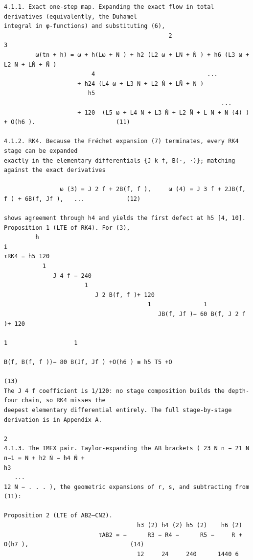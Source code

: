 \documentclass[letterpaper]{article}
\begin{document}
\begin{Verbatim}[fontsize=\fontsize{6.35}{7.15}\selectfont,breaklines=false]
4.1.1. Exact one-step map. Expanding the exact flow in total derivatives (equivalently, the Duhamel
integral in φ-functions) and substituting (6),
                                               2                       3
         ω(tn + h) = ω + h(Lω + N ) + h2 (L2 ω + LN + Ṅ ) + h6 (L3 ω + L2 N + LṄ + N̈ )
                         4                                ...
                     + h24 (L4 ω + L3 N + L2 Ṅ + LN̈ + N )
                        h5
                                                              ...
                     + 120  (L5 ω + L4 N + L3 Ṅ + L2 N̈ + L N + N (4) ) + O(h6 ).                       (11)

4.1.2. RK4. Because the Fréchet expansion (7) terminates, every RK4 stage can be expanded
exactly in the elementary differentials {J k f, B(·, ·)}; matching against the exact derivatives

                ω (3) = J 2 f + 2B(f, f ),     ω (4) = J 3 f + 2JB(f, f ) + 6B(f, Jf ),   ...            (12)

shows agreement through h4 and yields the first defect at h5 [4, 10].
Proposition 1 (LTE of RK4). For (3),
         h                                                                                                i
τRK4 = h5 120
           1
              J 4 f − 240
                       1
                          J 2 B(f, f )+ 120
                                         1               1
                                            JB(f, Jf )− 60 B(f, J 2 f )+ 120
                                                                          1                   1
                                                                             B(f, B(f, f ))− 80 B(Jf, Jf ) +O(h6 ) ≡ h5 T5 +O
                                                                                                          (13)
The J 4 f coefficient is 1/120: no stage composition builds the depth-four chain, so RK4 misses the
deepest elementary differential entirely. The full stage-by-stage derivation is in Appendix A.
                                                                                                     2
4.1.3. The IMEX pair. Taylor-expanding the AB brackets ( 23 N n − 21 N n−1 = N + h2 Ṅ − h4 N̈ +
h3
   ...
12 N − . . . ), the geometric expansions of r, s, and subtracting from (11):

Proposition 2 (LTE of AB2–CN2).
                                      h3 (2) h4 (2) h5 (2)    h6 (2)
                           τAB2 = −      R3 − R4 −      R5 −     R + O(h7 ),                             (14)
                                      12     24     240      1440 6


\end{Verbatim}
\end{document}
